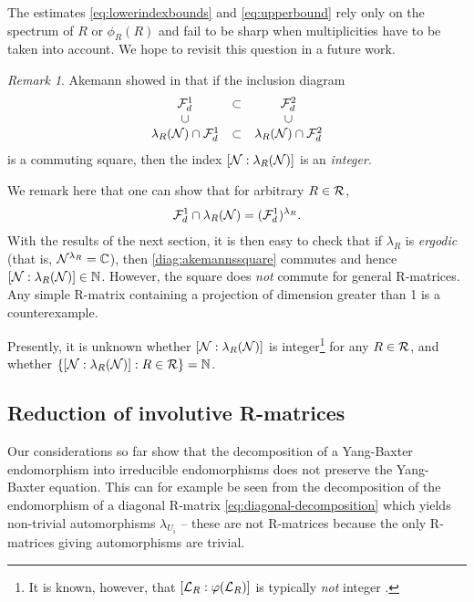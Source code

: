 \documentclass[12pt,a4paper]{amsart}
\numberwithin{equation}{section}
\theoremstyle{remark}
\newtheorem{remark}[theorem]{Remark}
\newcommand{\Cl}{\mathbb{C}}
\newcommand{\Nl}{\mathbb{N}}
\newcommand{\la}{\lambda}
\begin{document}
The estimates \eqref{eq:lowerindexbounds} and \eqref{eq:upperbound} rely only on the spectrum of $R$ or $\phi_R(R)$ and fail to be sharp when multiplicities have to be taken into account. We hope to revisit this question in a future work.

 
\begin{remark}
     Akemann showed in \cite{Akemann:1997} that if the inclusion diagram
    \begin{equation} \label{diag:akemannssquare}
        \begin{array}{ccc}
            \CF_d^1 & \subset & \CF_d^2 \\
            \cup &\,&\cup\\
            \la_R(\CN)\cap\CF_d^1 & \subset & \la_R(\CN)\cap\CF_d^2
        \end{array}
    \end{equation}
    is a commuting square, then the index $[\CN:\la_R(\CN)]$ is an {\em integer}. 
    
    We remark here that one can show that for arbitrary $R\in\mathcal{R}$, 
    \begin{align*}
        \CF_d^1\cap\la_R(\CN) = (\CF_d^1)^{\la_R}.
    \end{align*}
    With the results of the next section, it is then easy to check that if $\la_R$ is {\em ergodic} (that is, $\CN^{\la_R}=\Cl$), then \eqref{diag:akemannssquare} commutes and hence $[\CN:\la_R(\CN)]\in\Nl$. However, the square does {\em not} commute for general R-matrices. Any simple R-matrix containing a projection of dimension greater than 1 is a counterexample.
    
    Presently, it is unknown whether $[\CN:\la_R(\CN)]$ is integer\footnote{It is known, however, that $[\mathcal{L}_R:\varphi(\mathcal{L}_R)]$ is typically {\em not} integer \cite{Yamashita:2012,Tanner:2019}.} for any $R\in\mathcal{R}$, and whether $\{[\CN:\la_R(\CN)]:R\in\CR\}=\Nl$.
\end{remark}


\subsection{Reduction of involutive R-matrices}\label{section:reduction-of-involutives}

Our considerations so far show that the decomposition of a Yang-Baxter endomorphism into irreducible endomorphisms does not preserve the Yang-Baxter equation. This can for example be seen from the decomposition of the endomorphism of a diagonal R-matrix \eqref{eq:diagonal-decomposition} which yields non-trivial automorphisms $\la_{U_i}$ -- these are not R-matrices because the only R-matrices giving automorphisms are trivial.
\end{document}
